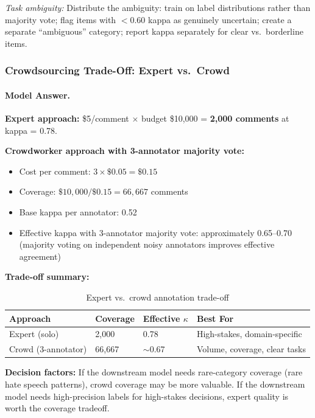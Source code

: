 \textit{Task ambiguity:} Distribute the ambiguity: train on label distributions rather than majority vote; flag items with $<0.60$ kappa as genuinely uncertain; create a separate ``ambiguous'' category; report kappa separately for clear vs.\ borderline items.

\subsubsection{Crowdsourcing Trade-Off: Expert vs.\ Crowd}

\paragraph{Model Answer.}

\textbf{Expert approach:} \$5/comment $\times$ budget \$10,000 = \textbf{2,000 comments} at kappa = 0.78.

\textbf{Crowdworker approach with 3-annotator majority vote:}
\begin{itemize}
    \item Cost per comment: $3 \times \$0.05 = \$0.15$
    \item Coverage: $\$10,000 / \$0.15 = 66,667$ comments
    \item Base kappa per annotator: 0.52
    \item Effective kappa with 3-annotator majority vote: approximately 0.65--0.70 (majority voting on independent noisy annotators improves effective agreement)
\end{itemize}

\textbf{Trade-off summary:}

\begin{table}[htbp]
\caption{Expert vs.\ crowd annotation trade-off}
\label{tab:expert-crowd-ch07}
\centering
\begin{tabular}{@{}p{3.5cm}p{2.5cm}p{2.5cm}p{3cm}@{}}
\toprule
\textbf{Approach} & \textbf{Coverage} & \textbf{Effective $\kappa$} & \textbf{Best For} \\
\midrule
Expert (solo) & 2,000 & 0.78 & High-stakes, domain-specific \\
Crowd (3-annotator) & 66,667 & $\sim$0.67 & Volume, coverage, clear tasks \\
\bottomrule
\end{tabular}
\end{table}

\textbf{Decision factors:} If the downstream model needs rare-category coverage (rare hate speech patterns), crowd coverage may be more valuable. If the downstream model needs high-precision labels for high-stakes decisions, expert quality is worth the coverage tradeoff.

